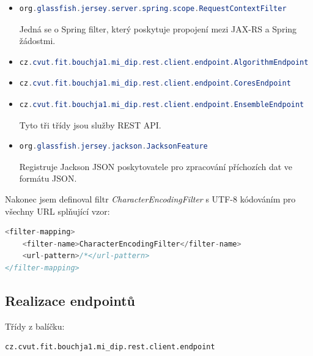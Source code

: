 \documentclass[thesis=M,czech]{FITthesis}[2014/05/07]
\begin{document}
\begin{itemize}
	\item 
\begin{lstlisting}[language=java]	
org.glassfish.jersey.server.spring.scope.RequestContextFilter
\end{lstlisting}
	
	Jedná se o Spring filter, který poskytuje propojení mezi JAX-RS a Spring žádostmi.
	
	\item
\begin{lstlisting}[language=java]	
cz.cvut.fit.bouchja1.mi_dip.rest.client.endpoint.AlgorithmEndpoint
\end{lstlisting}

	\item
\begin{lstlisting}[language=java]	
cz.cvut.fit.bouchja1.mi_dip.rest.client.endpoint.CoresEndpoint
\end{lstlisting}

	\item
\begin{lstlisting}[language=java]	
cz.cvut.fit.bouchja1.mi_dip.rest.client.endpoint.EnsembleEndpoint
\end{lstlisting}
	
	Tyto tři třídy jsou služby REST API. 
	\item
\begin{lstlisting}[language=java]		
org.glassfish.jersey.jackson.JacksonFeature	
\end{lstlisting}
	
	Registruje Jackson JSON poskytovatele pro zpracování příchozích dat ve formátu JSON.
\end{itemize}

Nakonec jsem definoval filtr \emph{CharacterEncodingFilter} s UTF-8 kódováním pro všechny URL splňující vzor:

\begin{lstlisting}[language=java]
<filter-mapping>
    <filter-name>CharacterEncodingFilter</filter-name>
    <url-pattern>/*</url-pattern>
</filter-mapping>    
\end{lstlisting}

\subsection{Realizace endpointů}
\label{sec:endpoints}
Třídy z balíčku:

\begin{verbatim}
cz.cvut.fit.bouchja1.mi_dip.rest.client.endpoint
\end{verbatim}
\end{document}
